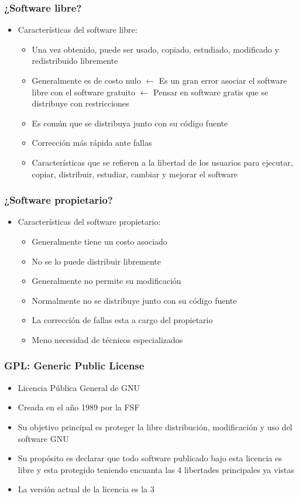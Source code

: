 \begin{frame}
	\frametitle{¿Software libre?}
	\begin{itemize}
		\item Características del software libre:
		\begin{itemize}
			\item Una vez obtenido, puede ser usado, copiado, estudiado, modificado y redistribuido libremente
			\item Generalmente es de costo nulo $\leftarrow$ Es un gran error asociar el software libre con el software gratuito $\leftarrow$ Pensar en software gratis que se distribuye con restricciones
			\item Es común que se distribuya junto con su código fuente
			\item Corrección más rápida ante fallas
			\item Características que se refieren a la libertad de los usuarios para ejecutar, copiar, distribuir, estudiar, cambiar y mejorar el software
		\end{itemize}
	\end{itemize}
\end{frame}

\begin{frame}
	\frametitle{¿Software propietario?}
	\begin{itemize}
		\item Características del software propietario:
		\begin{itemize}
			\item Generalmente tiene un costo asociado
			\item No se lo puede distribuir libremente
			\item Generalmente no permite su modificación
			\item Normalmente no se distribuye junto con su código fuente
			\item La corrección de fallas esta a cargo del propietario
			\item Meno necesidad de técnicos especializados
		\end{itemize}
	\end{itemize}
\end{frame}

\begin{frame}
	\frametitle{GPL: Generic Public License}
	\begin{itemize}
		\item Licencia Pública General de GNU
		\item Creada en el año 1989 por la FSF
		\item Su objetivo principal es proteger la libre distribución, modificación y uso del software GNU
		\item Su propósito es declarar que todo software publicado bajo esta licencia es libre y esta protegido teniendo encuanta las 4 libertades principales ya vistas
		\item La versión actual de la licencia es la 3
	\end{itemize}
\end{frame}

